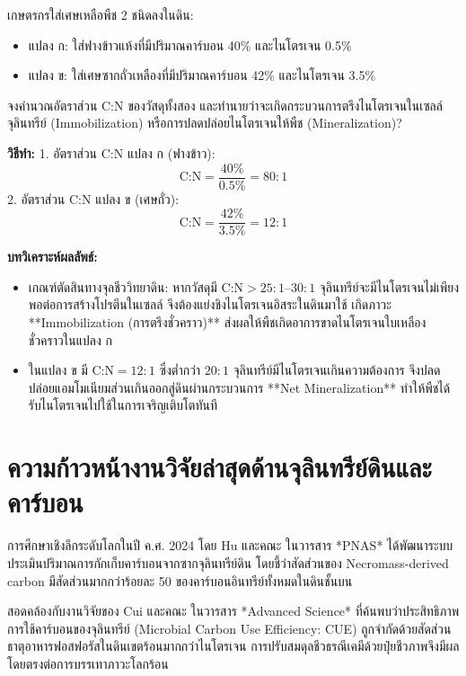 \begin{worked}
เกษตรกรใส่เศษเหลือพืช 2 ชนิดลงในดิน:
\begin{itemize}
    \item แปลง ก: ใส่ฟางข้าวแห้งที่มีปริมาณคาร์บอน 40\% และไนโตรเจน 0.5\%
    \item แปลง ข: ใส่เศษซากถั่วเหลืองที่มีปริมาณคาร์บอน 42\% และไนโตรเจน 3.5\%
\end{itemize}
จงคำนวณอัตราส่วน C:N ของวัสดุทั้งสอง และทำนายว่าจะเกิดกระบวนการตรึงไนโตรเจนในเซลล์จุลินทรีย์ (Immobilization) หรือการปลดปล่อยไนโตรเจนให้พืช (Mineralization)?

\textbf{วิธีทำ:}
1. อัตราส่วน C:N แปลง ก (ฟางข้าว):
$$\text{C:N} = \frac{40\%}{0.5\%} = 80:1$$
2. อัตราส่วน C:N แปลง ข (เศษถั่ว):
$$\text{C:N} = \frac{42\%}{3.5\%} = 12:1$$

\textbf{บทวิเคราะห์ผลลัพธ์:}
\begin{itemize}
    \item เกณฑ์ตัดสินทางจุลชีววิทยาดิน: หากวัสดุมี $\text{C:N} > 25:1$--$30:1$ จุลินทรีย์จะมีไนโตรเจนไม่เพียงพอต่อการสร้างโปรตีนในเซลล์ จึงต้องแย่งชิงไนโตรเจนอิสระในดินมาใช้ เกิดภาวะ **Immobilization (การตรึงชั่วคราว)** ส่งผลให้พืชเกิดอาการขาดไนโตรเจนใบเหลืองชั่วคราวในแปลง ก
    \item ในแปลง ข มี $\text{C:N} = 12:1$ ซึ่งต่ำกว่า $20:1$ จุลินทรีย์มีไนโตรเจนเกินความต้องการ จึงปลดปล่อยแอมโมเนียมส่วนเกินออกสู่ดินผ่านกระบวนการ **Net Mineralization** ทำให้พืชได้รับไนโตรเจนไปใช้ในการเจริญเติบโตทันที
\end{itemize}
\end{worked}

\section{ความก้าวหน้างานวิจัยล่าสุดด้านจุลินทรีย์ดินและคาร์บอน}

การศึกษาเชิงลึกระดับโลกในปี ค.ศ. 2024 โดย Hu และคณะ \cite{pmid39172788} ในวารสาร *PNAS* ได้พัฒนาระบบประเมินปริมาณการกักเก็บคาร์บอนจากซากจุลินทรีย์ดิน โดยชี้ว่าสัดส่วนของ Necromass-derived carbon มีสัดส่วนมากกว่าร้อยละ 50 ของคาร์บอนอินทรีย์ทั้งหมดในดินชั้นบน 

สอดคล้องกับงานวิจัยของ Cui และคณะ \cite{pmid39024521} ในวารสาร *Advanced Science* ที่ค้นพบว่าประสิทธิภาพการใช้คาร์บอนของจุลินทรีย์ (Microbial Carbon Use Efficiency: CUE) ถูกจำกัดด้วยสัดส่วนธาตุอาหารฟอสฟอรัสในดินเขตร้อนมากกว่าไนโตรเจน การปรับสมดุลชีวธรณีเคมีด้วยปุ๋ยชีวภาพจึงมีผลโดยตรงต่อการบรรเทาภาวะโลกร้อน

